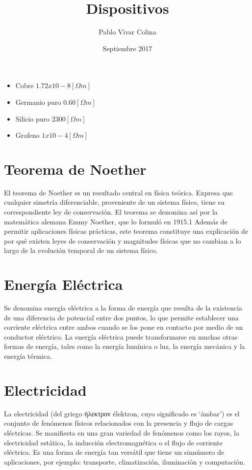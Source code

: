 \documentclass{article}
\title{Dispositivos}
\author{Pablo Vivar Colina}
\date{Septiembre 2017}
\begin{document}
\begin{itemize}
    \item Cobre $1.72 x 10-8 [\Omega m]$ \citep{RS}
    \item Germanio puro  $0.60 [\Omega m]$ \citep{RS}
\item Silicio puro $2300 [\Omega m]$ \citep{RS}
\item  Grafeno $1 x 10-4 [\Omega m]$ \citep{Graf}
\end{itemize}


\section{Teorema de Noether}

El teorema de Noether es un resultado central en física teórica. Expresa que cualquier simetría diferenciable, proveniente de un sistema físico, tiene su correspondiente ley de conservación. El teorema se denomina así por la matemática alemana Emmy Noether, que lo formuló en 1915.1​ Además de permitir aplicaciones físicas prácticas, este teorema constituye una explicación de por qué existen leyes de conservación y magnitudes físicas que no cambian a lo largo de la evolución temporal de un sistema físico.\citep{TN}

\section{Energía Eléctrica}

Se denomina energía eléctrica a la forma de energía que resulta de la existencia de una diferencia de potencial entre dos puntos, lo que permite establecer una corriente eléctrica entre ambos cuando se los pone en contacto por medio de un conductor eléctrico. La energía eléctrica puede transformarse en muchas otras formas de energía, tales como la energía lumínica o luz, la energía mecánica y la energía térmica.\citep{EE}

\section{Electricidad}

La electricidad (del griego ήλεκτρον élektron, cuyo significado es ‘ámbar’) es el conjunto de fenómenos físicos relacionados con la presencia y flujo de cargas eléctricas. Se manifiesta en una gran variedad de fenómenos como los rayos, la electricidad estática, la inducción electromagnética o el flujo de corriente eléctrica. Es una forma de energía tan versátil que tiene un sinnúmero de aplicaciones, por ejemplo: transporte, climatización, iluminación y computación.\citep{Elec}
\end{document}
